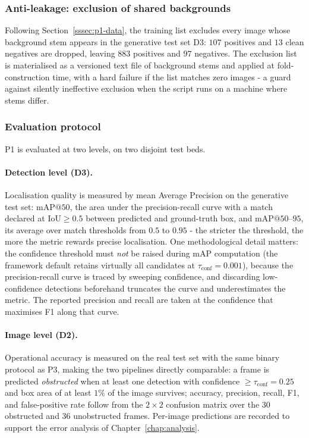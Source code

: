 \subsubsection{Anti-leakage: exclusion of shared backgrounds}

Following Section~\ref{sssec:p1-data}, the training list excludes every image
whose background stem appears in the generative test set D3: $107$ positives
and $13$ clean negatives are dropped, leaving $883$ positives and $97$
negatives. The exclusion list is materialised as a versioned text file of
background stems and applied at fold-construction time, with a hard failure if
the list matches zero images - a guard against silently ineffective exclusion
when the script runs on a machine where stems differ.

\subsubsection{Evaluation protocol}

P1 is evaluated at two levels, on two disjoint test beds.

\paragraph{Detection level (D3).} Localisation quality is measured by mean
Average Precision on the generative test set: mAP$@50$, the area under the
precision-recall curve with a match declared at $\mathrm{IoU} \geq 0.5$
between predicted and ground-truth box, and mAP$@50$--$95$, its average over
match thresholds from $0.5$ to $0.95$ - the stricter the threshold, the more
the metric rewards precise localisation. One methodological detail matters:
the confidence threshold must \emph{not} be raised during mAP computation
(the framework default retains virtually all candidates at
$\tau_{\mathrm{conf}} = 0.001$), because the precision-recall curve is traced
by sweeping confidence, and discarding low-confidence detections beforehand
truncates the curve and underestimates the metric. The reported
precision and recall are taken at the confidence that maximises F1 along that
curve.

\paragraph{Image level (D2).} Operational accuracy is measured on the real
test set with the same binary protocol as P3, making the two pipelines
directly comparable: a frame is predicted \emph{obstructed} when at least one
detection with confidence $\geq \tau_{\mathrm{conf}} = 0.25$ and box area of at
least $1\%$ of the image survives; accuracy, precision, recall, F1, and
false-positive rate follow from the $2 \times 2$ confusion matrix over the
$30$ obstructed and $36$ unobstructed frames. Per-image predictions are
recorded to support the error analysis of Chapter~\ref{chap:analysis}.

